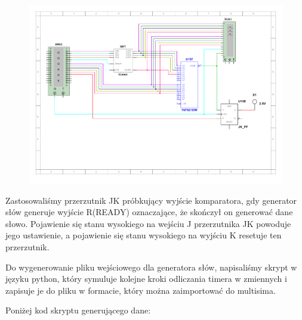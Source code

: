\documentclass[a4paper]{article}
\begin{document}
\begin{figure}[H]
    \centering
    \includegraphics[width=\textwidth]{general_test.pdf}
\end{figure}

Zastosowaliśmy przerzutnik JK próbkujący wyjście komparatora, gdy generator słów generuje wyjście R(READY)
oznaczające, że skończył on generować dane słowo. Pojawienie się stanu wysokiego na wejściu J przerzutnika JK
powoduje jego ustawienie, a pojawienie się stanu wysokiego na wyjściu K resetuje ten przerzutnik.

Do wygenerowanie pliku wejściowego dla generatora słów, napisaliśmy skrypt w języku python, który 
symuluje kolejne kroki odliczania timera w zmiennych i zapisuje je do pliku w formacie, który można zaimportować 
do multisima.

Poniżej kod skryptu generującego dane:
\small


\end{document}
